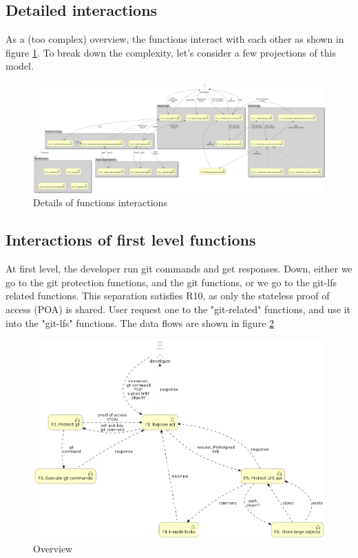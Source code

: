 \subsection{Detailed interactions}

As a (too complex) overview, the functions interact with each other as shown in figure \ref{fig:functions_detail}. To break down the complexity, let's consider a few projections of this model.

\begin{figure}[h]
    \centering
    \includegraphics[width=\textwidth]{iteration_01/diagrams/detailed_flow.png}
    \caption{Details of functions interactions}
    \label{fig:functions_detail}
\end{figure}

\subsection{Interactions of first level functions}

At first level, the developer run git commands and get responses. Down, either we go to the git protection functions, and the git functions, or we go to the git-lfs related functions. This separation satisfies R10, as only the stateless proof of access (POA) is shared. User request one to the "git-related" functions, and use it into the "git-lfs" functions. The data flows are shown in figure \ref{fig:functions_overview}

\begin{figure}[h]
    \centering
    \includegraphics[width=\textwidth]{iteration_01/diagrams/overwiew_flow.png}
    \caption{Overview}
    \label{fig:functions_overview}
\end{figure}

